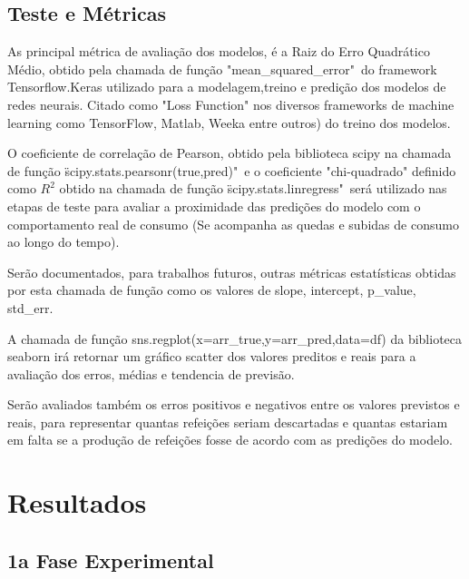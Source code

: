 \documentclass[	12pt, Times, openright, twoside, a4paper, english, brazil]{abntex2}
\begin{document}
    \section{Teste e Métricas}
       As principal métrica de avaliação dos modelos, é a Raiz do Erro Quadrático Médio, obtido pela chamada de função "mean\_squared\_error"\ do framework Tensorflow.Keras utilizado para a modelagem,treino e predição dos modelos de redes neurais. Citado como "Loss Function" nos diversos frameworks de machine learning como TensorFlow, Matlab, Weeka entre outros) do treino dos modelos.\newline
       
        O coeficiente de correlação de Pearson, obtido pela biblioteca scipy na chamada de função \"scipy.stats.pearsonr(true,pred)"\ e o coeficiente "chi-quadrado" definido como $R^2$ obtido na chamada de função \"scipy.stats.linregress"\ será utilizado nas etapas de teste para avaliar a proximidade das predições do modelo com o comportamento real de consumo (Se acompanha as quedas e subidas de consumo ao longo do tempo).\newline
       
        Serão documentados, para trabalhos futuros, outras métricas estatísticas obtidas por esta chamada de função como os valores de slope, intercept, p\_value, std\_err.\newline
       
        A chamada de função sns.regplot(x=arr\_true,y=arr\_pred,data=df) da biblioteca seaborn irá retornar um gráfico scatter dos valores preditos e reais para a avaliação dos erros, médias e tendencia de previsão.\newline 
       
       Serão avaliados também os erros positivos e negativos entre os valores previstos e reais, para representar quantas refeições seriam descartadas e quantas estariam em falta se a produção de refeições fosse de acordo com as predições do modelo.
       
  \chapter{Resultados}
	\section{1a Fase Experimental}
\end{document}
